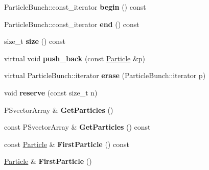 \begin{DoxyCompactItemize}
Particle\+Bunch\+::const\+\_\+iterator {\bfseries begin} () const
\item 
\mbox{\label{classParticleTracking_1_1ParticleBunch_aaae4e43e4e2954d08097271dc2b349b3}} 
Particle\+Bunch\+::const\+\_\+iterator {\bfseries end} () const
\item 
\mbox{\label{classParticleTracking_1_1ParticleBunch_a9eb04bb0e30be875481d8f0afa430f6c}} 
size\+\_\+t {\bfseries size} () const
\item 
\mbox{\label{classParticleTracking_1_1ParticleBunch_afcc7318ac80ba730bc15fb2f61aec004}} 
virtual void {\bfseries push\+\_\+back} (const \hyperlink{classPSvector}{Particle} \&p)
\item 
\mbox{\label{classParticleTracking_1_1ParticleBunch_a3fb3fa3aee9b2467d84c6c6d1a68ce79}} 
virtual Particle\+Bunch\+::iterator {\bfseries erase} (Particle\+Bunch\+::iterator p)
\item 
\mbox{\label{classParticleTracking_1_1ParticleBunch_a9a2af6df4a9a5db0e52c746d307f398c}} 
void {\bfseries reserve} (const size\+\_\+t n)
\item 
\mbox{\label{classParticleTracking_1_1ParticleBunch_a67b712588f6abde1932fac7164676f44}} 
P\+Svector\+Array \& {\bfseries Get\+Particles} ()
\item 
\mbox{\label{classParticleTracking_1_1ParticleBunch_a4d492545a95fd845d7698d44e4702029}} 
const P\+Svector\+Array \& {\bfseries Get\+Particles} () const
\item 
\mbox{\label{classParticleTracking_1_1ParticleBunch_a886578745bbd4593b790895084669969}} 
const \hyperlink{classPSvector}{Particle} \& {\bfseries First\+Particle} () const
\item 
\mbox{\label{classParticleTracking_1_1ParticleBunch_a198993d659cbcf536255350854104e67}} 
\hyperlink{classPSvector}{Particle} \& {\bfseries First\+Particle} ()

\end{DoxyCompactItemize}
